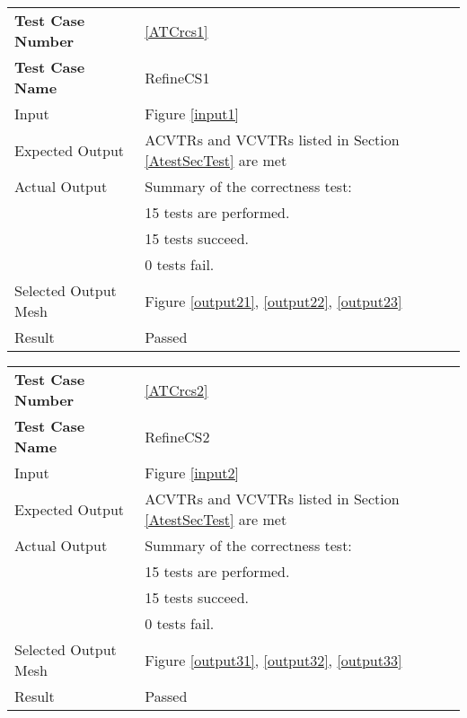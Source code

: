 \documentclass[12pt,titlepage]{article}
\begin{document}
\vspace{1cm}
\begin{minipage}{\textwidth}
\begin{tabular}{p{\colAwidth}|p{\colBwidth}} 
\hline \hline 
{\bf Test Case Number} & \cref{ATCrcs1} \\ 
{\bf Test Case Name} & RefineCS1\\ 
\hline
Input & Figure \ref{input1}\\
Expected Output & ACVTRs and VCVTRs listed in Section \ref{AtestSecTest} are met\\
Actual Output & Summary of the correctness test:\\
& 15 tests are performed.\\
& 15 tests succeed.\\
& 0 tests fail.\\
Selected Output Mesh & Figure \ref{output21}, \ref{output22}, \ref{output23}\\
Result & Passed\\
\hline \hline
\end{tabular}
\end{minipage}

\vspace{1cm}
\begin{minipage}{\textwidth}
\begin{tabular}{p{\colAwidth}|p{\colBwidth}} 
\hline \hline 
{\bf Test Case Number} & \cref{ATCrcs2} \\ 
{\bf Test Case Name} & RefineCS2\\ 
\hline
Input & Figure \ref{input2}\\
Expected Output & ACVTRs and VCVTRs listed in Section \ref{AtestSecTest} are met\\
Actual Output & Summary of the correctness test:\\
& 15 tests are performed.\\
& 15 tests succeed.\\
& 0 tests fail.\\
Selected Output Mesh & Figure \ref{output31}, \ref{output32}, \ref{output33}\\
Result & Passed\\
\hline \hline
\end{tabular}
\end{minipage}
\end{document}
